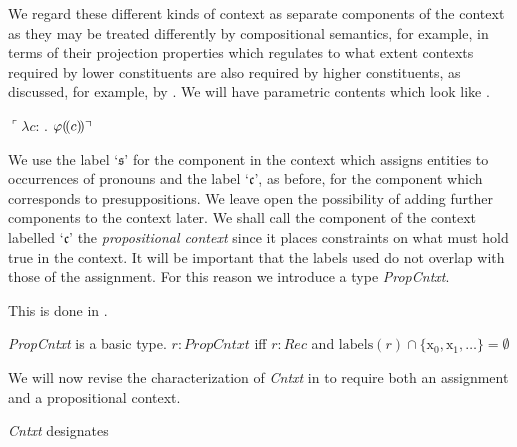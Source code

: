 We regard these different kinds of
context as separate components of the context as they may be treated differently by compositional
semantics, for example, in terms of their projection properties which
regulates to what extent contexts required by lower constituents are
also required by higher constituents, as discussed, for example, by
\cite{Potts2005}.  We will have parametric
contents which look like \nexteg{}.
\begin{ex} 
$\ulcorner\lambda c$: . $\varphi(\!(c)\!)\urcorner$ 
\end{ex}

We use the label `$\mathfrak{s}$' for the component in the context which
assigns entities to occurrences of pronouns and the label
`$\mathfrak{c}$', as before, for the component which corresponds to
presuppositions.  We leave open the possibility of adding further
components to the context later.  We shall call the component of the
context labelled `$\mathfrak{c}$' the \textit{propositional context}
since it places constraints on what must hold true in the context.  It
will be important that the labels used do not overlap with those of
the assignment.  For this reason we introduce a type
\textit{PropCntxt}.
\begin{shaded}
  This is done in \nexteg{}.
\begin{ex} 
\textit{PropCntxt} is a basic type.  $r:\textit{PropCntxt}$ iff
$r:\textit{Rec}$ and $\mathrm{labels}(r)\cap\{\text{x}_0,\text{x}_1,\ldots\}=\emptyset$ 
\end{ex} 
\end{shaded}

We will now revise the characterization of \textit{Cntxt} in \nexteg{} to require
both an assignment and a propositional context.
\begin{ex} 
  \textit{Cntxt} designates
  \begin{quote}
  \end{quote}
  
\end{ex} 




